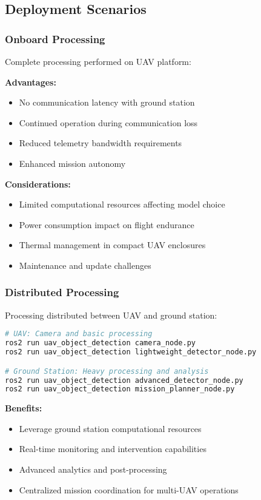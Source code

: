 \documentclass[11pt,a4paper]{article}
\begin{document}
\subsection{Deployment Scenarios}

\subsubsection{Onboard Processing}

Complete processing performed on UAV platform:

\textbf{Advantages:}
\begin{itemize}
    \item No communication latency with ground station
    \item Continued operation during communication loss
    \item Reduced telemetry bandwidth requirements
    \item Enhanced mission autonomy
\end{itemize}

\textbf{Considerations:}
\begin{itemize}
    \item Limited computational resources affecting model choice
    \item Power consumption impact on flight endurance
    \item Thermal management in compact UAV enclosures
    \item Maintenance and update challenges
\end{itemize}

\subsubsection{Distributed Processing}

Processing distributed between UAV and ground station:

\begin{lstlisting}[language=bash, caption=Distributed Deployment Example]
# UAV: Camera and basic processing
ros2 run uav_object_detection camera_node.py
ros2 run uav_object_detection lightweight_detector_node.py

# Ground Station: Heavy processing and analysis
ros2 run uav_object_detection advanced_detector_node.py
ros2 run uav_object_detection mission_planner_node.py
\end{lstlisting}

\textbf{Benefits:}
\begin{itemize}
    \item Leverage ground station computational resources
    \item Real-time monitoring and intervention capabilities
    \item Advanced analytics and post-processing
    \item Centralized mission coordination for multi-UAV operations
\end{itemize}
\end{document}
